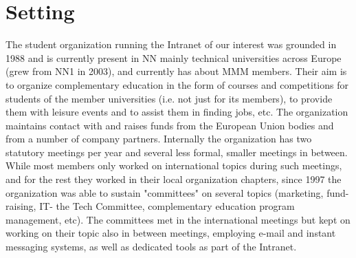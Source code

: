\documentclass{acm_proc_article-sp}
\begin{document}

\section{Setting}\label{sec:setting}
The student organization running the Intranet of our interest was grounded in 1988 and is currently present in NN mainly technical universities across Europe (grew from NN1 in 2003), and currently has about MMM members. Their aim is to organize complementary education in the form of courses and competitions for students of the member universities (i.e. not just for its members), to provide them with leisure events and to assist them in finding jobs, etc. 
The organization maintains contact with and raises funds from the European Union bodies and from a number of company partners. Internally the organization has two statutory meetings per year and several less formal, smaller meetings in between. While most members only worked on international topics during such meetings, and for the rest they worked in their local organization chapters, since 1997 the organization was able to sustain "committees" on several topics (marketing, fund-raising, IT- the Tech Committee, complementary education program management, etc). The committees met in the international meetings but kept on working on their topic also in between meetings, employing e-mail and instant messaging systems, as well as dedicated tools as part of the Intranet.
\end{document}
